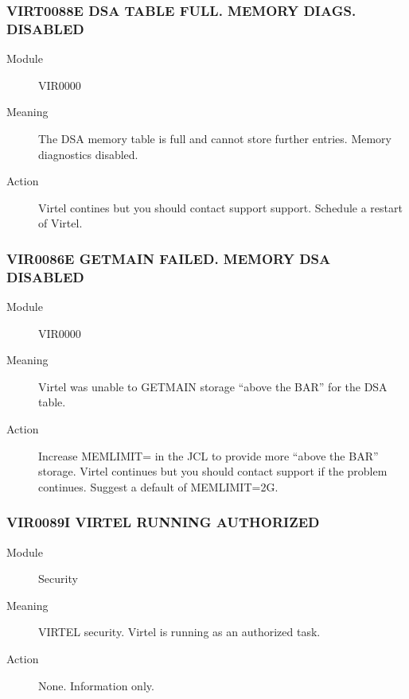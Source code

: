 \documentclass[letterpaper,10pt,english]{sphinxmanual}
\begin{document}
\subsubsection{VIRT0088E DSA TABLE FULL. MEMORY DIAGS. DISABLED}
\label{\detokenize{messages:virt0088e-dsa-table-full-memory-diags-disabled}}\begin{description}
\item[{Module}] \leavevmode
VIR0000

\item[{Meaning}] \leavevmode
The DSA memory table is full and cannot store further entries. Memory diagnostics disabled.

\item[{Action}] \leavevmode
Virtel contines but you should contact support support. Schedule a restart of Virtel.

\end{description}


\subsubsection{VIR0086E GETMAIN FAILED. MEMORY DSA DISABLED}
\label{\detokenize{messages:id6}}\begin{description}
\item[{Module}] \leavevmode
VIR0000

\item[{Meaning}] \leavevmode
Virtel was unable to GETMAIN storage “above the BAR” for the DSA table.

\item[{Action}] \leavevmode
Increase MEMLIMIT= in the JCL to provide more “above the BAR” storage. Virtel continues but you should contact support if the problem continues. Suggest a default of MEMLIMIT=2G.

\end{description}


\subsubsection{VIR0089I VIRTEL RUNNING AUTHORIZED}
\label{\detokenize{messages:vir0089i-virtel-running-authorized}}\begin{description}
\item[{Module}] \leavevmode
Security

\item[{Meaning}] \leavevmode
VIRTEL security. Virtel is running as an authorized task.

\item[{Action}] \leavevmode
None. Information only.

\end{description}
\end{document}
